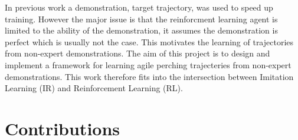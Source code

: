 In previous work a demonstration, target trajectory, was used to speed up training.
However the major issue is that the reinforcment learning agent is limited to the ability of the demonstration, it assumes the demonstration is perfect which is usually not the case.
This motivates the learning of trajectories from non-expert demonstrations.
The aim of this project is to design and implement a framework for learning agile perching trajecteries from non-expert demonstrations.
This work therefore fits into the intersection between Imitation Learning (IR) and Reinforcement Learning (RL).

\section{Contributions}